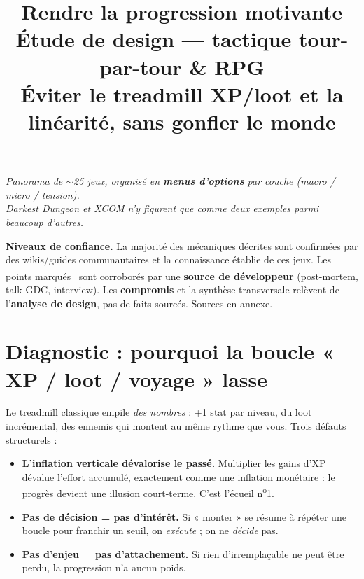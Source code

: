 \documentclass[11pt,a4paper]{article}
\title{\vspace{-1.5em}\textbf{\color{ink}\Huge Rendre la progression motivante}\\[0.3em]
\large\color{accent}Étude de design --- tactique tour-par-tour \& RPG\\[0.2em]
\normalsize\color{ink}Éviter le treadmill XP/loot et la linéarité, sans gonfler le monde}
\author{}
\date{}
\newcommand{\dv}{\,\textsuperscript{\textcolor{accent2}{\textdagger}}}
\begin{document}
\maketitle
\vspace{-3em}

\begin{center}
\small\itshape Panorama de $\sim$25 jeux, organisé en \textbf{menus d'options} par couche (macro / micro / tension).\\
Darkest Dungeon et XCOM n'y figurent que comme deux exemples parmi beaucoup d'autres.
\end{center}

\begin{tcolorbox}[colback=soft,colframe=softline,boxrule=0.5pt,arc=2pt,left=8pt,right=8pt,top=5pt,bottom=5pt]
\small\textbf{Niveaux de confiance.} La majorité des mécaniques décrites sont confirmées par des wikis/guides communautaires et la connaissance établie de ces jeux. Les points marqués \dv{} sont corroborés par une \textbf{source de développeur} (post-mortem, talk GDC, interview). Les \textbf{compromis} et la synthèse transversale relèvent de l'\textbf{analyse de design}, pas de faits sourcés. Sources en annexe.
\end{tcolorbox}

\tableofcontents

\section{Diagnostic : pourquoi la boucle « XP / loot / voyage » lasse}

Le treadmill classique empile \emph{des nombres} : +1 stat par niveau, du loot incrémental, des ennemis qui montent au même rythme que vous. Trois défauts structurels :

\begin{itemize}
\item \textbf{L'inflation verticale dévalorise le passé.} Multiplier les gains d'XP dévalue l'effort accumulé, exactement comme une inflation monétaire : le progrès devient une illusion court-terme. C'est l'écueil n\textsuperscript{o}1.
\item \textbf{Pas de décision = pas d'intérêt.} Si « monter » se résume à répéter une boucle pour franchir un seuil, on \emph{exécute} ; on ne \emph{décide} pas.
\item \textbf{Pas d'enjeu = pas d'attachement.} Si rien d'irremplaçable ne peut être perdu, la progression n'a aucun poids.
\end{itemize}
\end{document}
